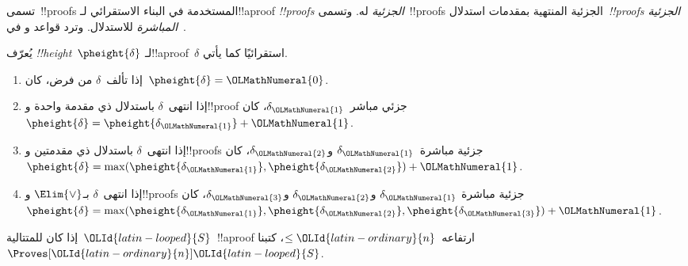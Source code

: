 \documentclass[../../../include/open-logic-section]{subfiles}
\begin{document}
تسمى~!!{proof}s المستخدمة في البناء الاستقرائي لـ!!a{proof}
\emph{!!{proof}s الجزئية} له. وتسمى~!!{proof}s الجزئية المنتهية بمقدمات
استدلال~\emph{!!{proof}s الجزئية المباشرة} للاستدلال. وترد قواعد
 و في~.



\begin{defn}
يُعرّف \emph{!!{height}}~$\pheight{\delta}$ لـ!!a{proof}~$\delta$
استقرائيًا كما يأتي.
\begin{enumerate}
  \item إذا تألف~$\delta$ من فرض، كان~$\pheight{\delta}=\OLMathNumeral{0}$.
  \item إذا انتهى~$\delta$ باستدلال ذي مقدمة واحدة و!!{proof} جزئي
  مباشر~$\delta_\OLMathNumeral{1}$، كان~$\pheight{\delta}=\pheight{\delta_\OLMathNumeral{1}}+\OLMathNumeral{1}$.
  \item إذا انتهى~$\delta$ باستدلال ذي مقدمتين و!!{proof}s جزئية
  مباشرة~$\delta_\OLMathNumeral{1}$ و$\delta_\OLMathNumeral{2}$، كان~$\pheight{\delta}=
  \max(\pheight{\delta_\OLMathNumeral{1}},\pheight{\delta_\OLMathNumeral{2}})+\OLMathNumeral{1}$.
  \item إذا انتهى~$\delta$ بـ$\Elim{\lor}$ و!!{proof}s جزئية مباشرة
  $\delta_\OLMathNumeral{1}$ و$\delta_\OLMathNumeral{2}$ و$\delta_\OLMathNumeral{3}$، كان~$\pheight{\delta}=
  \max(\pheight{\delta_\OLMathNumeral{1}},\pheight{\delta_\OLMathNumeral{2}},\pheight{\delta_\OLMathNumeral{3}})+\OLMathNumeral{1}$.
\end{enumerate}
إذا كان للمتتالية~$\OLId{latin-looped}{S}$~!!a{proof} ارتفاعه~$\le \OLId{latin-ordinary}{n}$، كتبنا~$\Proves[\OLId{latin-ordinary}{n}] \OLId{latin-looped}{S}$.
\end{defn}
\end{document}
